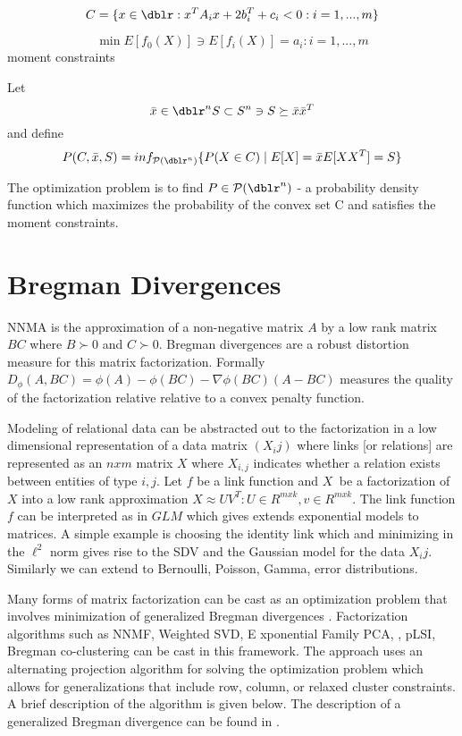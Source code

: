 \begin{equation}  C = \{ x \in \dblr :  x^T A_i x + 2 b_{i}^{T} +c_i <0 : i=1, ...,m \} \end{equation}

\begin{equation}
\min E[f_0(X)] \ni E[f_i(X)] = a_i : i=1, ...,m
\end{equation}
 moment constraints

Let
\begin{equation}
 \bar{x} \in \dblr^n S \subset S^n \ni S \succeq \bar{x} \bar{x}^T
\end{equation}
  and define
 \begin{equation}
 P(C,\bar{x},S) = inf_{\mathcal{P}(\dblr^n)} \{P(X \in C) \mid E[X] = \bar{x} E[X X^T] = S \}
 \end{equation}

The optimization problem is to find $ P \in \mathcal{P}(\dblr^n) $ - a probability density function which maximizes the probability of the convex set C and satisfies the moment constraints.



\section{Bregman Divergences}
NNMA is the approximation of a non-negative matrix $A$ by a low rank matrix $BC$ where $B\succ 0$ and $C\succ 0$.  Bregman divergences are a robust distortion measure for this matrix factorization.  Formally $D_\phi(A,BC)=\phi(A)-\phi(BC) - \nabla\phi(BC) (A-BC)$ measures the quality of the factorization relative relative to a convex penalty function.

Modeling of relational data can be abstracted out to the factorization in a low dimensional representation of a data matrix $(X_ij)$ where links [or relations] are represented as an $n x m$ matrix $X$ where $X_{i,j}$ indicates whether a relation exists between entities of type $i, j$.  Let $f$ be a link function and $X^{~}$ be a factorization of $X$ into a low rank approximation $X \approx U V^T : U \in R^{m x k}, v \in R^{m x k}$.  The link function $f$ can be interpreted as in $GLM$ which gives extends exponential models to matrices.  A simple example is choosing the identity link which and minimizing in the $\ell^2$ norm gives rise to the SDV and the Gaussian model for the data ${X_ij}$.  Similarly we can  extend to Bernoulli, Poisson, Gamma, error distributions.

Many forms of matrix factorization can be cast as an optimization problem that involves minimization of generalized Bregman divergences \cite{BDAUnifiedViewMatrixFactorizationModels}.  Factorization algorithms such as  NNMF, Weighted SVD, E xponential Family PCA, , pLSI, Bregman co-clustering \cite{CCBanerjee04ageneralized} can be cast in this framework. The approach uses an alternating projection algorithm for solving the optimization problem which allows for generalizations that include row, column, or relaxed cluster  constraints.  A brief description of the algorithm is given below.  The description of a generalized Bregman divergence can be found in \cite{BDGordon99approximatesolutions}.

